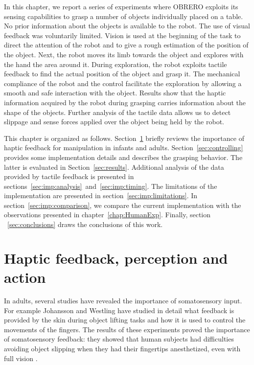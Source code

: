 In this chapter, we report a series of experiments where OBRERO
exploits its sensing capabilities to grasp a number of objects
individually placed on a table. No prior information about the
objects is available to the robot. The use of visual feedback was
voluntarily limited. Vision is used at the beginning of the task
to direct the attention of the robot and to give a rough
estimation of the position of the object. Next, the robot moves
its limb towards the object and explores with the hand the area
around it. During exploration, the robot exploits tactile feedback
to find the actual position of the object and grasp it. The
mechanical compliance of the robot and the control facilitate the
exploration by allowing a smooth and safe interaction with the
object. Results show that the haptic information acquired by the
robot during grasping carries information about the shape of the
objects. Further analysis of the tactile data allows us to detect
slippage and sense forces applied over the object being held by
the robot.

This chapter is organized as follows. Section~\ref{sec:background}
briefly reviews the importance of haptic feedback for manipulation
in infants and adults. Section~\ref{sec:controlling} provides some
implementation details and describes the grasping behavior. The
latter is evaluated in Section~\ref{sec:results}. Additional
analysis of the data provided by tactile feedback is presented in
sections~\ref{sec:imp:analysis}~and~\ref{sec:imp:timing}. The
limitations of the implementation are presented in
section~\ref{sec:imp:limitations}. In
section~\ref{sec:imp:comparison}, we compare the current
implementation with the observations presented in
chapter~\ref{chap:HumanExp}. Finally, section
~\ref{sec:conclusions} draws the conclusions of this work.

\section{Haptic feedback, perception and action}
\label{sec:background}

In adults, several studies have revealed the importance of
somatosensory input. For example Johansson and Westling
\cite{Johansson90Tactile} have studied in detail what feedback is
provided by the skin during object lifting tasks and how it is
used to control the movements of the fingers. The results of these
experiments proved the importance of somatosensory feedback: they
showed that human subjects had difficulties avoiding object
slipping when they had their fingertips anesthetized, even with
full vision \cite{johansson91how}.


